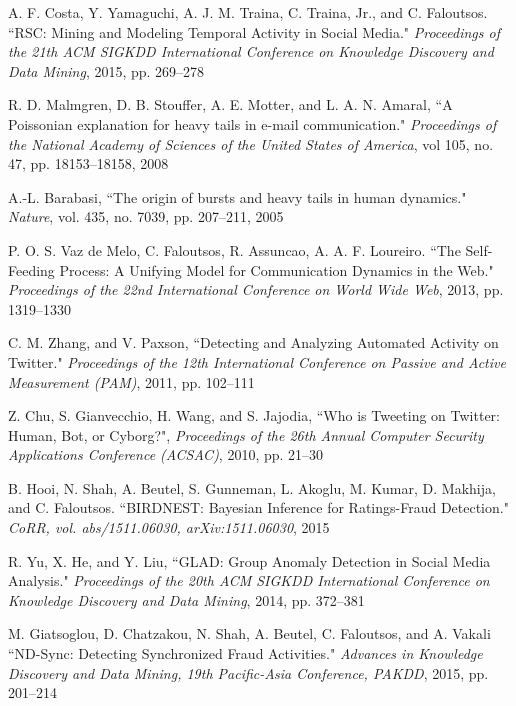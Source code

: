 \documentclass[11pt, oneside]{article}   	%
\begin{document}
\begin{thebibliography}{123}

 A. F. Costa, Y. Yamaguchi, A. J. M. Traina, C. Traina, Jr., and C. Faloutsos. ``RSC: Mining and Modeling Temporal Activity in Social Media." \emph{Proceedings of the 21th ACM SIGKDD International Conference on Knowledge Discovery and Data Mining}, 2015, pp. 269--278

 R. D. Malmgren, D. B. Stouffer, A. E. Motter, and L. A. N. Amaral, ``A Poissonian explanation for heavy tails in e-mail communication." \emph{Proceedings of the National Academy of Sciences of the United States of America}, vol 105, no. 47, pp. 18153--18158, 2008

 A.-L. Barabasi, ``The origin of bursts and heavy tails in human dynamics." \emph{Nature}, vol. 435, no. 7039, pp. 207--211, 2005

 P. O. S. Vaz de Melo, C. Faloutsos, R. Assuncao, A. A. F. Loureiro. ``The Self-Feeding Process: A Unifying Model for Communication Dynamics in the Web." \emph{Proceedings of the 22nd International Conference on World Wide Web}, 2013, pp. 1319--1330 

 C. M. Zhang, and V. Paxson, ``Detecting and Analyzing Automated Activity on Twitter." \emph{Proceedings of the 12th International Conference on Passive and Active Measurement (PAM)}, 2011, pp. 102--111 

 Z. Chu, S. Gianvecchio, H. Wang, and S. Jajodia, ``Who is Tweeting on Twitter: Human, Bot, or Cyborg?", \emph{Proceedings of the 26th Annual Computer Security Applications Conference (ACSAC)}, 2010, pp. 21--30  

 B. Hooi, N. Shah, A. Beutel, S. Gunneman, L. Akoglu, M. Kumar, D. Makhija, and C. Faloutsos. ``BIRDNEST: Bayesian Inference for Ratings-Fraud Detection." \emph{CoRR, vol. abs/1511.06030, arXiv:1511.06030}, 2015

 R. Yu, X. He, and Y. Liu, ``GLAD: Group Anomaly Detection in Social Media Analysis." \emph{Proceedings of the 20th ACM SIGKDD International Conference on Knowledge Discovery and Data Mining}, 2014, pp. 372--381

 M. Giatsoglou, D. Chatzakou, N. Shah, A. Beutel, C. Faloutsos, and A. Vakali ``ND-Sync: Detecting Synchronized Fraud Activities." \emph{Advances in Knowledge Discovery and Data Mining, 19th Pacific-Asia Conference, PAKDD}, 2015, pp. 201--214


\end{thebibliography}
\end{document}
